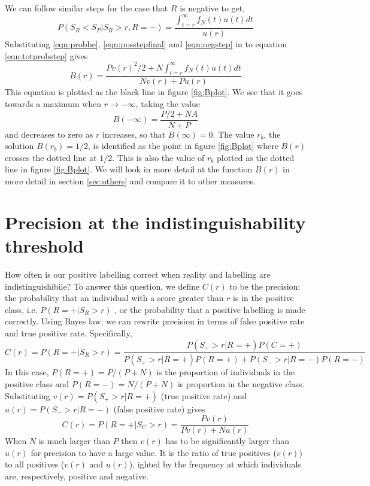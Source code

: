 \documentclass[preprint,12pt]{elsarticle}
\begin{document}
We can follow similar steps for the case that $R$ is negative to get,
\begin{equation}
P(S_R < S_P | S_{R} > r ,  R = -   ) = \frac{\int_{t=r}^\infty f_N(t) u(t) dt}{u(r)}  \label{eqn:negstep}
\end{equation}
Substituting \ref{eqn:probbe}, \ref{eqn:posstepfinal} and \ref{eqn:negstep} in to equation \ref{eqn:totprobstep} gives
\begin{equation}
B(r) = \frac{P v(r)^2/2 + N \int_{t=r}^\infty f_N(t) u(t) dt }{N v(r) + P u(r)} 
 \label{eqn:Bdef} 
\end{equation}
This equation is plotted as the black line in figure \ref{fig:Bplot}. We see that it goes towards a maximum when $r \rightarrow -\infty$, taking the value
\[
B(-\infty) = \frac{P/2 + N A}{N + P} 
\]
and decreases to zero as $r$ increases, so that $B(\infty) = 0$. The value $r_b$, the solution $B(r_b)=1/2$, is identified as the point in figure \ref{fig:Bplot} where $B(r)$ crosses the dotted line at $1/2$. This is also the value of $r_b$ plotted as the dotted line in figure \ref{fig:Bplot}. We will look in more detail at the function $B(r)$ in more detail in section \ref{sec:others} and compare it to other measures. 

\section{Precision at the indistinguishability threshold}

How often is our positive labelling correct when reality and labelling are indistinguishibile? To answer this question, we define $C(r)$ to be the precision: the probability that an individual with a score greater than $r$ is in the positive class, i.e. $P(R = + | S_R > r)$ , or the probability that a positive labelling is made correctly.  Using Bayes law, we can rewrite precision in terms of false positive rate and true positive rate. Specifically,
\[
C(r) = P(R = + | S_R > r) = \frac{P(S_+ > r | R = + ) P(C = + )}{P(S_+ > r | R = + ) P(R = + ) + P(S_- > r | R = - ) P(R = - )}
\]
In this case, $P(R = + ) = P/(P+N)$ is the proportion of individuals in the positive class and $P(R = - ) = N/(P+N)$ is proportion in the negative class. Substituting $v(r)=P(S_+ > r | R = + )$ (true positive rate) and $u(r) = P(S_- > r | R = - )$  (false positive rate) gives
\begin{equation}
C(r) = P(R = + | S_C > r) = \frac{P v(r)}{P v(r) + N u(r)} \label{precisionP}
\end{equation}
When $N$ is much larger than $P$ then $v(r)$ has to be significantly larger than $u(r)$ for precision to have a large value. It is the ratio of true positives ($v(r)$) to all positives ($v(r)$ and $u(r)$), ighted by the frequency at which individuals are, respectively, positive and negative. 
\end{document}
